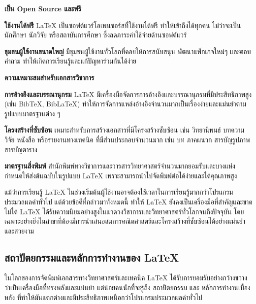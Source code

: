 \hspace*{1.5em} %
\textbf{เป็น Open Source และฟรี}
    \begin{mycustomitem}
        \item \textbf{ใช้งานได้ฟรี} LaTeX เป็นซอฟต์แวร์โอเพนซอร์สที่ใช้งานได้ฟรี ทำให้เข้าถึงได้ทุกคน ไม่ว่าจะเป็นนักศึกษา นักวิจัย หรือสถาบันการศึกษา ซึ่งลดภาระค่าใช้จ่ายด้านซอฟต์แวร์
        \item \textbf{ชุมชนผู้ใช้งานขนาดใหญ่} มีชุมชนผู้ใช้งานทั่วโลกที่คอยให้การสนับสนุน พัฒนาแพ็กเกจใหม่ๆ และตอบคำถาม ทำให้เกิดการเรียนรู้และแก้ปัญหาร่วมกันได้ง่าย
    \end{mycustomitem}

\hspace*{1.5em} %
\textbf{ความเหมาะสมสำหรับเอกสารวิชาการ}
    \begin{mycustomitem}
        \item \textbf{การอ้างอิงและบรรณานุกรม} LaTeX มีเครื่องมือจัดการการอ้างอิงและบรรณานุกรมที่มีประสิทธิภาพสูง (เช่น BibTeX, BibLaTeX) ทำให้การจัดการแหล่งอ้างอิงจำนวนมากเป็นเรื่องง่ายและแม่นยำตามรูปแบบมาตรฐานต่าง ๆ
        \item \textbf{โครงสร้างที่ซับซ้อน} เหมาะสำหรับการสร้างเอกสารที่มีโครงสร้างซับซ้อน เช่น วิทยานิพนธ์ บทความวิจัย หนังสือ หรือรายงานทางเทคนิค ที่มีส่วนประกอบจำนวนมาก เช่น บท ภาคผนวก สารบัญรูปภาพ สารบัญตาราง
        \item \textbf{มาตรฐานสิ่งพิมพ์} สำนักพิมพ์ทางวิชาการและวารสารวิทยาศาสตร์จำนวนมากยอมรับและบางแห่งกำหนดให้ส่งต้นฉบับในรูปแบบ LaTeX เพราะสามารถนำไปจัดพิมพ์ต่อได้ง่ายและได้คุณภาพสูง
    \end{mycustomitem}

\hspace*{1.5em} %
แม้ว่าการเรียนรู้ LaTeX ในช่วงเริ่มต้นผู้ใช้งานอาจต้องใช้เวลาในการเรียนรู้มากกว่าโปรแกรมประมวลผลคำทั่วไป แต่ด้วยข้อดีที่กล่าวมาทั้งหมดนี้ ทำให้ LaTeX ยังคงเป็นเครื่องมือที่สำคัญและขาดไม่ได้ LaTeX ได้รับความนิยมอย่างสูงในแวดวงวิชาการและวิทยาศาสตร์ทั่วโลกจนถึงปัจจุบัน โดยเฉพาะอย่างยิ่งในสาขาที่ต้องมีการนำเสนอสมการคณิตศาสตร์และโครงสร้างที่ซับซ้อนได้อย่างแม่นยำและสวยงาม

\subsection{สถาปัตยกรรมและหลักการทำงานของ LaTeX}

\hspace*{1.5em} %
ในโลกของการจัดพิมพ์เอกสารทางวิทยาศาสตร์และเทคนิค LaTeX ได้รับการยอมรับอย่างกว้างขวางว่าเป็นเครื่องมือที่ทรงพลังและแม่นยำ แต่น้อยคนนักที่จะรู้ถึง สถาปัตยกรรม และ หลักการทำงานเบื้องหลัง ที่ทำให้มันแตกต่างและมีประสิทธิภาพเหนือกว่าโปรแกรมประมวลผลคำทั่วไป

